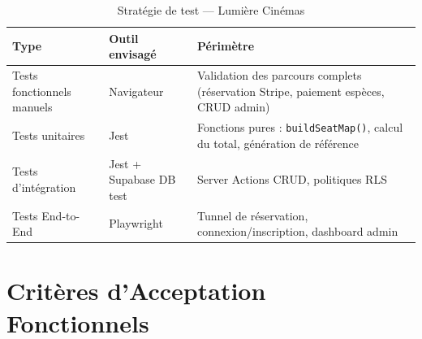 \documentclass[12pt,a4paper,openany]{report}
\begin{document}
\begin{table}[H]
\centering
\begin{tabularx}{\textwidth}{llX}
\toprule
\textbf{Type} & \textbf{Outil envisagé} & \textbf{Périmètre} \\
\midrule
Tests fonctionnels manuels & Navigateur & Validation des parcours complets (réservation Stripe, paiement espèces, CRUD admin) \\
Tests unitaires            & Jest        & Fonctions pures : \texttt{buildSeatMap()}, calcul du total, génération de référence \\
Tests d'intégration        & Jest + Supabase DB test & Server Actions CRUD, politiques RLS \\
Tests End-to-End           & Playwright  & Tunnel de réservation, connexion/inscription, dashboard admin \\
\bottomrule
\end{tabularx}
\caption{Stratégie de test — Lumière Cinémas}
\end{table}

\section{Critères d'Acceptation Fonctionnels}
\end{document}
